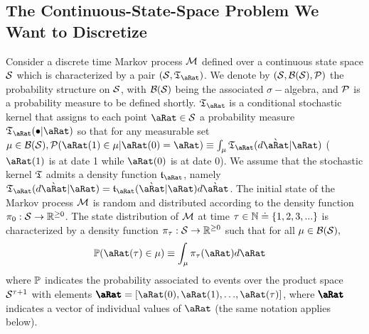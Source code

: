 \documentclass[../BufferStockTheory.tex]{subfiles}\usepackage{ApndxSteadyState}
\begin{document}
  \subsection{The Continuous-State-Space Problem We Want to Discretize} 
  Consider a discrete time Markov process $\mathcal{M}$ defined over a continuous state space $\mathcal{S}$ which is characterized by a pair $(\DistSetSprtFull,\Trns_{\point})$.   We denote by $(\mathcal{S},\mathcal{B}(\mathcal{S}),\mathcal{P})$ the probability structure on $\mathcal{S}$, with $\mathcal{B}(\mathcal{S})$ being the associated $\sigma-$algebra, and $\mathcal{P}$ is a probability measure to be defined shortly. $\Trns_{\point}$ is a conditional stochastic kernel  that assigns to each point $\point \in \DistSetSprtFull$ a probability measure $\Trns_{\point}(\bullet|\point)$ so that for any measurable set $\SetSub \in \Borel(\DistSetSprtFull), \Pcurl(\point(1) \in \SetSub|\point(0)=\point) \equiv \int_{\SetSub}\Trns_{\point}(d\Nxt{\point}|\point)$ ($\point(1)$ is at date 1 while $\point(0)$ is at date 0).  We assume that the stochastic kernel $\mathfrak{T}$ admits a density function $\trns_{\point}$, namely $\Trns_{\point}(d\Nxt{\point}|\point) = \trns_{\point}(\Nxt{\point}|\point)d\Nxt{\point}$.
  The initial state of the Markov process $\mathcal{M}$ is random  and distributed according to the density function $\pi_{0} : \mathcal{S} \rightarrow \mathbb{R}^{\geq 0}$.  The state distribution of $\mathcal{M}$ at time $\tau \in \mathbb{N} \doteq  \{1,2,3,...\}$ is characterized by a density function $\pi_{\tau} : \mathcal{\mathcal{S}} \rightarrow \mathbb{R}^{\geq 0}$ such that for all $\mu \in \mathcal{B}({\mathcal{S}}),$
  \begin{align}
    \Pmeas(\point(\tAbs) \in \SetSub) & \equiv \int_{\SetSub} \pDens_{\tAbs}(\point)d\point
  \end{align}
  where $\mathbb{P}$ indicates the probability associated to events over the product space $\mathcal{S}^{\tau+1}$ with elements $\vctr{\point}=[\point(0),\point(1),{\dots},\point(\tAbs)]$, where $\vctr{\point}$ indicates a vector of individual values of $\point$ (the same notation applies below).
\end{document}
